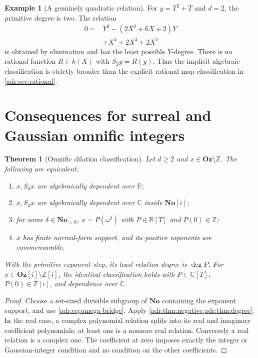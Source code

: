 \documentclass[11pt,letterpaper]{article}
\numberwithin{equation}{section}
\newtheorem{theorem}{Theorem}[section]
\theoremstyle{definition}
\newtheorem{example}[example]{Example}
\theoremstyle{remark}
\newcommand{\No}{\mathbf{No}}
\newcommand{\Oz}{\mathbf{Oz}}
\newcommand{\SC}{\mathbf{No}[i]}
\newcommand{\Goz}{\mathbf{Oz}[i]}
\newcommand{\C}{\mathbb C}
\newcommand{\R}{\mathbb R}
\newcommand{\Z}{\mathbb Z}
\begin{document}
\begin{example}[A genuinely quadratic relation]
For $y=T^2+T$ and $d=2$, the primitive degree is two. The relation
\begin{align}\label{adr:eq:sample-resultant}
 0={}&Y^2-(2X^2+6X+2)Y\\
     &+X^4+2X^3+2X^2\nonumber
\end{align}
is obtained by elimination and has the least possible $Y$-degree.
There is no rational function $R\in k(X)$ with $S_2y=R(y)$.
Thus the implicit algebraic classification is strictly broader than the
explicit rational-map classification in \cref{adr:sec:rational}.
\end{example}

\section{Consequences for surreal and Gaussian omnific integers}
\label{adr:sec:omnific}

\begin{theorem}[Omnific dilation classification]\label{adr:thm:omnific}
Let $d\ge2$ and $x\in\Oz\setminus\Z$. The following are equivalent:
\begin{enumerate}[label=\textup{(\roman*)},leftmargin=2em,itemsep=2pt]
\item $x,S_dx$ are algebraically dependent over $\R$;
\item $x,S_dx$ are algebraically dependent over $\C$ inside $\SC$;
\item for some $\delta\in\No_{>0}$,
      $x=P(\omega^\delta)$ with $P\in\R[T]$ and $P(0)\in\Z$;
\item $x$ has finite normal-form support, and its positive exponents are
      commensurable.
\end{enumerate}
With the primitive exponent step, its least relation degree is $\deg P$.
For $x\in\Goz\setminus\Z[i]$, the identical classification holds with
$P\in\C[T]$, $P(0)\in\Z[i]$, and dependence over $\C$.
\end{theorem}
\begin{proof}
Choose a set-sized divisible subgroup of $\No$ containing the exponent
support, and use \eqref{adr:eq:omega-bridge}. Apply
\cref{adr:thm:negative,adr:thm:degree}. In the real case, a complex polynomial
relation splits into its real and imaginary coefficient polynomials;
at least one is a nonzero real relation. Conversely a real relation is
a complex one. The coefficient at zero imposes exactly the integer or
Gaussian-integer condition and no condition on the other coefficients.
\end{proof}
\end{document}
